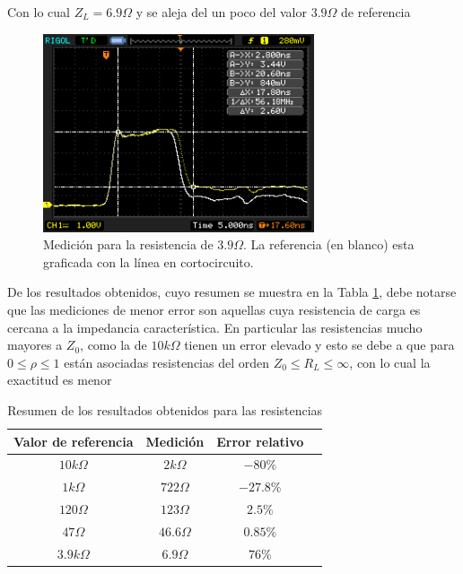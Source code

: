 \documentclass[a4paper,10pt]{article}
\begin{document}
	\indent Con lo cual $Z_L=6.9\Omega$ y se aleja del un poco del valor 
	$3.9\Omega$ de referencia
		
		\begin{figure}[!htb]
			\centering
			\includegraphics[width=8cm]
			{Imagenes/Res3e9.png}
			\caption{Medici\'on para la resistencia de $3.9\Omega$. La 
			referencia (en blanco) esta graficada con la l\'inea en 
			cortocircuito.}
			\label{img005}
		\end{figure}

	\indent De los resultados obtenidos, cuyo resumen se muestra en la Tabla 
	\ref{tab001}, debe notarse que las mediciones de menor error son aquellas 
	cuya resistencia de carga es cercana a la impedancia caracter\'istica. En
	particular las resistencias mucho mayores a $Z_0$, como la de $10k\Omega$ 
	tienen un error elevado y esto se debe a que para $0\leq \rho \leq 1$ 
	est\'an asociadas resistencias del orden $Z_0 \leq R_L \leq \infty$, con 
	lo cual la exactitud es menor
	
		\begin{table}[!htp]
			\centering
			\begin{tabular}{|c|c|c|c|}
				\hline
    			Valor de referencia & Medici\'on & Error relativo \\
				\hline
				$10k\Omega$ & $2k\Omega$ &$-80 \% $ \\
				\hline 
				$1k\Omega$ & $722\Omega$ &$-27.8\%$\\
				\hline
				$120\Omega$ & $123\Omega$ &$2.5\% $ \\
				\hline
				$47\Omega$ & $46.6\Omega$ &$0.85\% $ \\
				\hline
				$3.9k\Omega$ & $6.9\Omega$ &$76\% $  \\
				\hline								
			\end{tabular}
			\caption{Resumen de los resultados obtenidos para las resistencias
			} 
			\label{tab001}
		\end{table}
		
\end{document}
